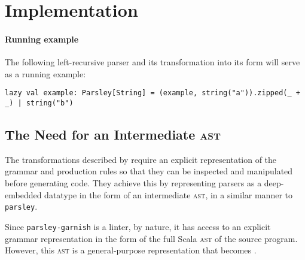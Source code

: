 \documentclass[../../main.tex]{subfiles}
\begin{document}
\label{sec:factor-leftrec}

\section{Implementation}

\paragraph{Running example}
The following left-recursive parser and its transformation into its  form will serve as a running example:
\begin{verbatim}
lazy val example: Parsley[String] = (example, string("a")).zipped(_ + _) | string("b")
\end{verbatim}

\subsection{The Need for an Intermediate \textsc{ast}}\label{sec:parser-ast-motivation}
The transformations described by \textcite{baars_leftrec_2004} require an explicit representation of the grammar and production rules so that they can be inspected and manipulated before generating code.
They achieve this by representing parsers as a deep-embedded datatype in the form of an intermediate \textsc{ast}, in a similar manner to \texttt{parsley}.

Since \texttt{parsley-garnish} is a linter, by nature, it has access to an explicit grammar representation in the form of the full Scala \textsc{ast} of the source program.
However, this \textsc{ast} is a general-purpose representation that becomes .
\end{document}
